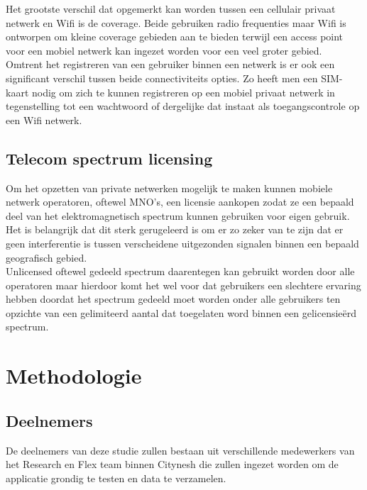 Het grootste verschil dat opgemerkt kan worden tussen een cellulair privaat netwerk en Wifi is de coverage. Beide gebruiken radio frequenties maar Wifi is ontworpen om kleine coverage gebieden aan te bieden terwijl een access point voor een mobiel netwerk kan ingezet worden voor een veel groter gebied.\autocite{2024Digi} \\

Omtrent het registreren van een gebruiker binnen een netwerk is er ook een significant verschil tussen beide connectiviteits opties. Zo heeft men een SIM-kaart nodig om zich te kunnen registreren op een mobiel privaat netwerk in tegenstelling tot een wachtwoord of dergelijke dat instaat als toegangscontrole op een Wifi netwerk.\autocite{David2024}

\subsection{Telecom spectrum licensing}

Om het opzetten van private netwerken mogelijk te maken kunnen mobiele netwerk operatoren, oftewel MNO's, een licensie aankopen zodat ze een bepaald deel van het elektromagnetisch spectrum kunnen gebruiken voor eigen gebruik. Het is belangrijk dat dit sterk gerugeleerd is om er zo zeker van te zijn dat er geen interferentie is tussen verscheidene uitgezonden signalen binnen een bepaald geografisch gebied.\autocite{Trick2022} \\

Unlicensed oftewel gedeeld spectrum daarentegen kan gebruikt worden door alle operatoren maar hierdoor komt het wel voor dat gebruikers een slechtere ervaring hebben doordat het spectrum gedeeld moet worden onder alle gebruikers ten opzichte van een gelimiteerd aantal dat toegelaten word binnen een gelicensieërd spectrum.\autocite{Trick2022}


\section{Methodologie}%
\label{sec:methodologie}

\subsection{Deelnemers}

De deelnemers van deze studie zullen bestaan uit verschillende medewerkers van het Research en Flex team binnen Citynesh die zullen ingezet worden om de applicatie grondig te testen en data te verzamelen.


